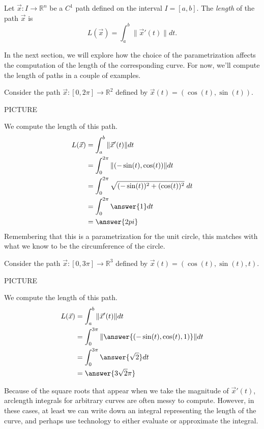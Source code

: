 \documentclass{ximera}
\begin{document}
\begin{definition}
Let $\vec{x}:I\rightarrow\mathbb{R}^n$ be a $C^1$ path defined on the interval $I=[a,b]$. The \emph{length} of the path $\vec{x}$ is 
\[
L(\vec{x}) = \int_a^b\|\vec{x}'(t)\|dt.
\]
\end{definition} 

In the next section, we will explore how the choice of the parametrization affects the computation of the length of the corresponding curve. For now, we'll compute the length of paths in a couple of examples.

\begin{example}
Consider the path $\vec{x}:[0,2\pi]\rightarrow\mathbb{R}^2$ defined by $\vec{x}(t) = (\cos(t),\sin(t))$.

PICTURE

We compute the length of this path.
\begin{align*}
L(\vec{x}) &= \int_a^b\|\vec{x}'(t)\|dt\\
&= \int_{0}^{2\pi}\|(-\sin(t),\cos(t))\|dt\\
&= \int_{0}^{2\pi} \sqrt{(-\sin(t))^2 + (\cos(t))^2}\;dt\\
&= \int_{0}^{2\pi} \answer{1}dt\\
& = \answer{2pi}
\end{align*}
Remembering that this is a parametrization for the unit circle, this matches with what we know to be the circumference of the circle.
\end{example}

\begin{example}
Consider the path $\vec{x}:[0,3\pi]\rightarrow\mathbb{R}^3$ defined by $\vec{x}(t) = (\cos(t),\sin(t),t)$.

PICTURE

We compute the length of this path.
\begin{align*}
L(\vec{x}) &= \int_a^b\|\vec{x}'(t)\|dt\\
&= \int_{0}^{3\pi} \|\answer{(-\sin(t),\cos(t),1)}\|dt\\
&= \int_{0}^{3\pi} \answer{\sqrt{2}}dt\\
&= \answer{3\sqrt{2}\pi}
\end{align*}
\end{example}

Because of the square roots that appear when we take the magnitude of $\vec{x}'(t)$, arclength integrals for arbitrary curves are often messy to compute. However, in these cases, at least we can write down an integral representing the length of the curve, and perhaps use technology to either evaluate or approximate the integral.
\end{document}
